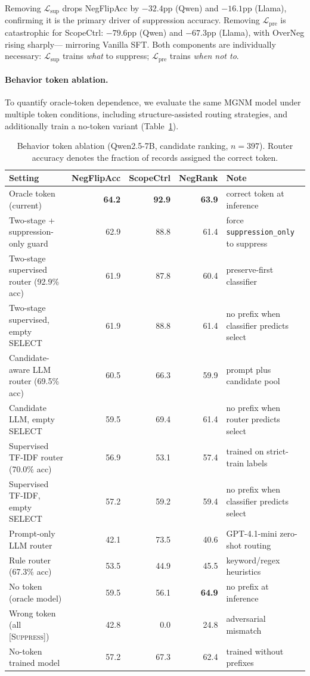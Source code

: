 \documentclass[letterpaper]{article}
\begin{document}
Removing $\mathcal{L}_\text{sup}$ drops NegFlipAcc by $-32.4$pp (Qwen)
and $-16.1$pp (Llama), confirming it is the primary driver of
suppression accuracy.
Removing $\mathcal{L}_\text{pre}$ is catastrophic for ScopeCtrl:
$-79.6$pp (Qwen) and $-67.3$pp (Llama), with OverNeg rising sharply---
mirroring Vanilla SFT.
Both components are individually necessary: $\mathcal{L}_\text{sup}$ trains
\emph{what} to suppress; $\mathcal{L}_\text{pre}$ trains \emph{when not to}.

\paragraph{Behavior token ablation.}
To quantify oracle-token dependence, we evaluate the same MGNM model under
multiple token conditions, including structure-assisted routing strategies, and
additionally train a no-token variant (Table~\ref{tab:token_ablation}).

\begin{table}[t]
\centering
\small
\caption{Behavior token ablation (Qwen2.5-7B, candidate ranking, $n{=}397$).
  Router accuracy denotes the fraction of records assigned the correct token.}
\label{tab:token_ablation}
\setlength{\tabcolsep}{4pt}
\begin{tabular}{lrrrl}
\toprule
Setting & NegFlipAcc & ScopeCtrl & NegRank & Note \\
\midrule
Oracle token (current)         & \textbf{64.2} & \textbf{92.9} & \textbf{63.9} & correct token at inference \\
\midrule
Two-stage + suppression-only guard & 62.9 & 88.8 & 61.4 & force \texttt{suppression\_only} to suppress \\
Two-stage supervised router (92.9\% acc) & 61.9 & 87.8 & 60.4 & preserve-first classifier \\
Two-stage supervised, empty SELECT & 61.9 & 88.8 & 61.4 & no prefix when classifier predicts select \\
Candidate-aware LLM router (69.5\% acc) & 60.5 & 66.3 & 59.9 & prompt plus candidate pool \\
Candidate LLM, empty SELECT    & 59.5 & 69.4 & 61.4 & no prefix when router predicts select \\
Supervised TF-IDF router (70.0\% acc) & 56.9 & 53.1 & 57.4 & trained on strict-train labels \\
Supervised TF-IDF, empty SELECT & 57.2 & 59.2 & 59.4 & no prefix when classifier predicts select \\
Prompt-only LLM router         & 42.1 & 73.5 & 40.6 & GPT-4.1-mini zero-shot routing \\
Rule router (67.3\% acc)       & 53.5 & 44.9 & 45.5 & keyword/regex heuristics \\
\midrule
No token (oracle model)        & 59.5 & 56.1 & \textbf{64.9} & no prefix at inference \\
Wrong token (all \textsc{[Suppress]}) & 42.8 & \phantom{0}0.0 & 24.8 & adversarial mismatch \\
No-token trained model         & 57.2 & 67.3 & 62.4 & trained without prefixes \\
\bottomrule
\end{tabular}
\end{table}
\end{document}
